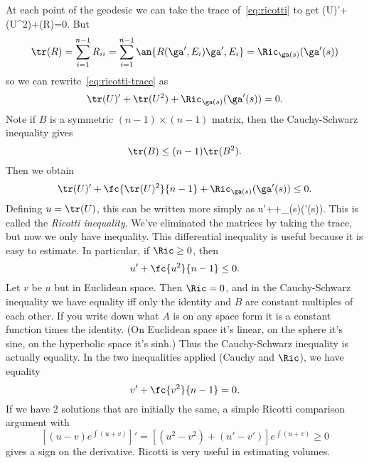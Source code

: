 At each point of the geodesic we can take the trace of~\eqref{eq:ricotti} to get
\tr(U)'+\tr(U^2)+\tr(R)=0.
\eeq
But
\[
\tr(R)=\sum_{i=1}^{n-1}R_{ii}
=\sum_{i=1}^{n-1}\an{R(\ga',E_i)\ga',E_i}=\Ric_{\ga(s)}(\ga'(s))
\]
so we can rewrite~\eqref{eq:ricotti-trace} as
\[
\tr(U)'+\tr(U^2)+\Ric_{\ga(s)}(\ga'(s))=0.
\]
Note if $B$ is a symmetric $(n-1)\times(n-1)$ matrix, then the Cauchy-Schwarz inequality gives
\[
\tr(B)\le (n-1)\tr(B^2).
\]
Then we obtain
\[
\tr(U)'+\fc{\tr(U)^2}{n-1}+\Ric_{\ga(s)}(\ga'(s))\le0.
\]
Defining $u=\tr(U)$, this can be written more simply as
u'++\Ric_{\ga(s)}(\ga'(s)).
\eeq
This is called the {\it Ricotti inequality}. 
We've eliminated the matrices by taking the trace, but now we only have inequality. This differential inequality is useful because it is easy to estimate.
In particular, if $\Ric\ge 0$, then
\[
u'+\fc{u^2}{n-1}\le 0.
\]
Let $v$ be $u$ but in Euclidean space. Then $\Ric=0$, and in the Cauchy-Schwarz inequality we have equality iff only the identity and $B$ are constant multiples of each other. If you write down what $A$ is on any space form it is a constant function times the identity. (On Euclidean space it's linear, on the sphere it's sine, on the hyperbolic space it's sinh.) Thus the Cauchy-Schwarz inequality is actually equality. In the two inequalities applied (Cauchy and $\Ric$), we have equality
\[
v'+\fc{v^2}{n-1}=0.
\]
If we have 2 solutions that are initially the same, a simple Ricotti comparison argument with %
\[
[(u-v)e^{\int (u+v)}]'=[(u^2-v^2)+(u'-v')]e^{\int (u+v)}\ge0
\]
gives a sign on the derivative. %
Ricotti is very useful in estimating volumes.